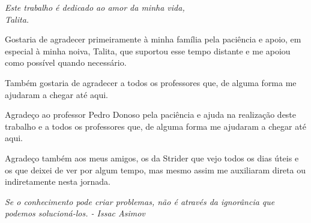 \documentclass[
	12pt,				%
	openright,			%
	twoside,			%
	a4paper,			%
	english,			%
	french,				%
	spanish,			%
	brazil,				%
	]{abntex2}
\begin{document}
\frenchspacing 

\pretextual

\imprimircapa

\imprimirfolhaderosto

	\begin{dedicatoria}
	   \vspace*{\fill}
	   \centering
	   \noindent
	   \textit{ Este trabalho é dedicado ao amor da minha vida,\\
	   		Talita.} \vspace*{\fill}
	\end{dedicatoria}


	\begin{agradecimentos}

	Gostaria de agradecer primeiramente à minha família pela paciência e apoio, em especial à minha noiva, Talita, que suportou esse tempo distante e me apoiou como possível quando necessário.  

	Também gostaria de agradecer a todos os professores que, de alguma forma me ajudaram a chegar até aqui. 

	Agradeço ao professor Pedro Donoso pela paciência e ajuda na realização deste trabalho e a todos os professores que, de alguma forma me ajudaram a chegar até aqui.
	
	Agradeço também aos meus amigos, os da Strider que vejo todos os dias úteis e os que deixei de ver por algum tempo, mas mesmo assim me auxiliaram direta ou indiretamente nesta jornada.

	\end{agradecimentos}


	\begin{epigrafe}
			\vspace*{\fill}
		\begin{flushright}
			\textit{Se o conhecimento pode criar problemas, não é através da ignorância que podemos solucioná-los. - Issac Asimov}
		\end{flushright}
	\end{epigrafe}
\end{document}
